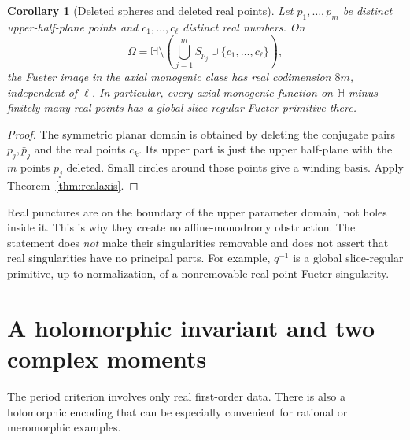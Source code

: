 \documentclass[11pt,a4paper]{article}
\numberwithin{equation}{section}
\newtheorem{corollary}[theorem]{Corollary}
\theoremstyle{definition}
\theoremstyle{remark}
\newcommand{\HH}{\mathbb H}
\begin{document}
\begin{corollary}[Deleted spheres and deleted real points]
\label{cor:deleted}
Let $p_1,\ldots,p_m$ be distinct upper-half-plane points and
$c_1,\ldots,c_\ell$ distinct real numbers. On
\begin{equation}
 \Omega=\HH\setminus\left(\bigcup_{j=1}^m S_{p_j}
                          \cup\{c_1,\ldots,c_\ell\}\right),
 \label{eq:deleted-domain}
\end{equation}
the Fueter image in the axial monogenic class has real codimension $8m$,
independent of $\ell$. In particular, every axial monogenic function on
$\HH$ minus finitely many real points has a global slice-regular Fueter
primitive there.
\end{corollary}
\begin{proof}
The symmetric planar domain is obtained by deleting the conjugate pairs
$p_j,\bar p_j$ and the real points $c_k$. Its upper part is just the
upper half-plane with the $m$ points $p_j$ deleted. Small circles around
those points give a winding basis. Apply Theorem~\ref{thm:realaxis}.
\end{proof}

Real punctures are on the boundary of the upper parameter domain, not
holes inside it. This is why they create no affine-monodromy obstruction.
The statement does \emph{not} make their singularities removable and does
not assert that real singularities have no principal parts. For example,
$q^{-1}$ is a global slice-regular primitive, up to normalization, of a
nonremovable real-point Fueter singularity.

\section{A holomorphic invariant and two complex moments}
\label{sec:holomorphic}
The period criterion involves only real first-order data. There is also a
holomorphic encoding that can be especially convenient for rational or
meromorphic examples.
\end{document}
